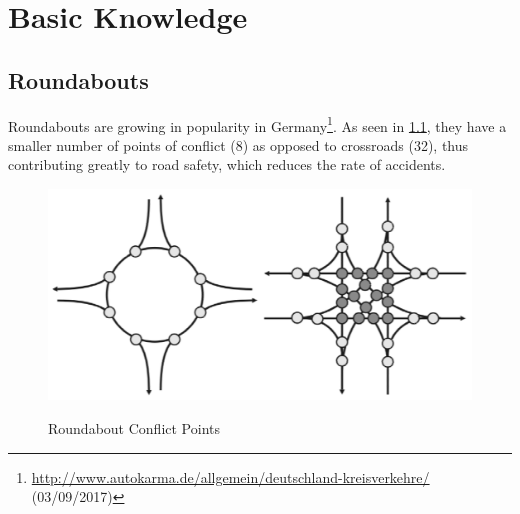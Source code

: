 \chapter{Basic Knowledge}

\section{Roundabouts}
Roundabouts are growing in popularity in Germany\footnote{\url{http://www.autokarma.de/allgemein/deutschland-kreisverkehre/} (03/09/2017)}.
As seen in \cref{conflict_roundabout}, they have a smaller number of points of conflict (8) as opposed to crossroads (32), thus contributing greatly to road safety, which reduces the rate of accidents.

\begin{figure}[!ht]
\caption{Roundabout Conflict Points \cite{man06}}
 \includegraphics[width=\textwidth]{bilder/conflict.png}
\label{conflict_roundabout}
\end{figure}


